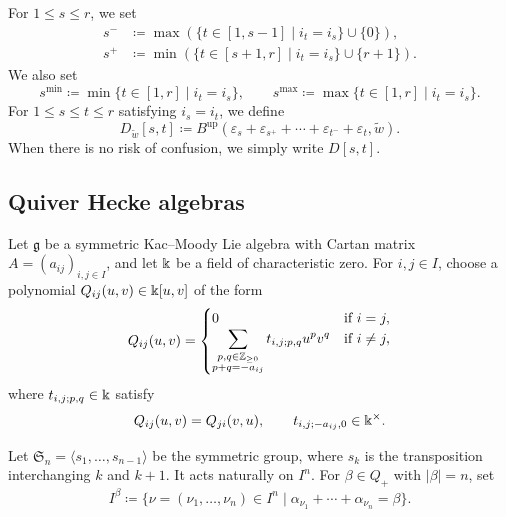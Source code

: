 For $1 \leq s \leq r$, we set
\[
\begin{aligned}
s^- &\coloneq
\max(\{t \in [1, s - 1] \mid i_t = i_s\} \cup \{0\}), \\
s^+ &\coloneq
\min(\{t \in [s + 1, r] \mid i_t = i_s\} \cup \{r + 1\}).
\end{aligned}
\]
We also set
\[
s^{\min} \coloneq \min\{t \in [1, r] \mid i_t = i_s\}, \qquad
s^{\max} \coloneq \max\{t \in [1, r] \mid i_t = i_s\}.
\]
For $1 \leq s \leq t \leq r$ satisfying $i_s = i_t$, we define
\[
D_{\widetilde{w}}[s, t] \coloneq
B^{\mathrm{up}}(\varepsilon_s + \varepsilon_{s^+} + \cdots
+ \varepsilon_{t^-} + \varepsilon_t, \widetilde{w}).
\]
When there is no risk of confusion, we simply write $D[s, t]$.

\subsection{Quiver Hecke algebras}
\label{ssec : quiver Hecke algebras}

Let $\mathfrak{g}$ be a symmetric Kac--Moody Lie algebra
with Cartan matrix $A = (a_{ij})_{i, j \in I}$,
and let $\Bbbk$ be a field of characteristic zero.
For $i, j \in I$, choose a polynomial $Q_{ij}(u, v) \in \Bbbk[u, v]$
of the form
\[
Q_{ij}(u, v) =
\begin{cases}
0 & \text{if } i = j, \\
\displaystyle\sum_{\substack{p, q \in \mathbb{Z}_{\geq 0} \\
p + q = -a_{ij}}} t_{i, j; p, q}u^p v^q & \text{if } i \neq j,
\end{cases}
\]
where $t_{i, j; p, q} \in \Bbbk$ satisfy
\[
Q_{ij}(u, v) = Q_{ji}(v, u), \qquad
t_{i, j; -a_{ij}, 0} \in \Bbbk^\times.
\]

Let $\mathfrak{S}_n = \langle s_1, \ldots, s_{n - 1}\rangle$
be the symmetric group, where $s_k$ is the transposition
interchanging $k$ and $k + 1$.
It acts naturally on $I^n$.
For $\beta \in Q_+$ with $|\beta| = n$, set
\[
I^\beta \coloneq
\{\nu = (\nu_1, \ldots, \nu_n) \in I^n \mid
\alpha_{\nu_1} + \cdots + \alpha_{\nu_n} = \beta\}.
\]

